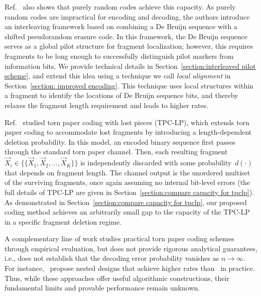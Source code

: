 \documentclass[journal,letterpaper,onecolumn,11pt]{IEEEtran}
\begin{document}
Ref.~\cite{shomorony2021torn} also shows that purely random codes achieve this capacity.
As purely random codes are impractical for encoding and decoding, the authors introduce an interleaving framework based on combining a De Bruijn sequence with a shifted pseudorandom erasure code. 
In this framework, the De Bruijn sequence serves as a global pilot structure for fragment localization; however, this requires fragments to be long enough to successfully distinguish pilot markers from information bits. We provide technical details in Section~\ref{section:interleaved pilot scheme}, and extend this idea using a technique we call \textit{local alignment} in Section~\ref{section: improved encoding}.
This technique uses local structures within a fragment to identify the locations of De Bruijn sequence bits, and thereby relaxes the fragment length requirement and leads to higher rates.

Ref.~\cite{ravi2024recovering} studied torn paper coding with lost pieces (TPC-LP), which extends torn paper coding to accommodate lost fragments by introducing a length-dependent deletion probability. 
In this model, an encoded binary sequence first passes through the standard torn paper channel. 
Then, each resulting fragment $\vec{X}_i \in \{\{\vec{X}_1, \vec{X}_2, \ldots, \vec{X}_K\}\}$ is independently discarded with some probability~$d(\cdot)$ that depends on fragment length. 
The channel output is the unordered multiset of the surviving fragments, once again assuming no internal bit-level errors (the full details of TPC-LP are given in Section~\ref{section:compare capacity for tpclp}). 
As demonstrated in Section~\ref{section:compare capacity for tpclp}, our proposed coding method achieves an arbitrarily small gap to the capacity of the TPC-LP in a specific fragment deletion regime.

A complementary line of work studies practical torn paper coding schemes through empirical evaluation, but does not provide rigorous analytical guarantees, i.e., does not establish that the decoding error probability vanishes as $n \to \infty$.
For instance,~\cite{nassirpour2023dna,jiao2025efficient} propose nested designs that achieve higher rates than~\cite{shomorony2021torn} in practice.
Thus, while these approaches offer useful algorithmic constructions, their fundamental limits and provable performance remain unknown.
\end{document}
